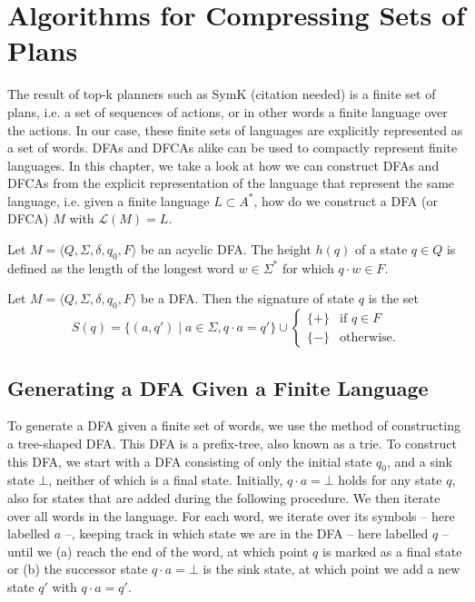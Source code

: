 \chapter{Algorithms for Compressing Sets of Plans}
The result of top-k planners such as SymK (citation needed) is a finite set of plans, i.e. a set of sequences of actions, or in other words a finite language over the actions. In our case, these finite sets of languages are explicitly represented as a set of words. DFAs and DFCAs alike can be used to compactly represent finite languages. In this chapter, we take a look at how we can construct DFAs and DFCAs from the explicit representation of the language that represent the same language, i.e. given a finite language $L \subset A^*$, how do we construct a DFA (or DFCA) $M$ with $\mathcal L(M) = L$.


\begin{definition}
Let $M = \langle Q, \Sigma, \delta, q_0, F \rangle$ be an acyclic DFA. The height $h(q)$ of a state $q \in Q$ is defined as the length of the longest word $w \in \Sigma^*$ for which $q \cdot w \in F$.
\end{definition}

\begin{definition}
Let $M = \langle Q, \Sigma, \delta, q_0, F \rangle$ be a DFA. Then the signature of state $q$ is the set
\[S(q) = \{(a, q') \mid a \in \Sigma, q \cdot a = q'\} \cup \begin{cases}\{+\} &\text{if } q \in F \\\{-\} &\text{otherwise.}\end{cases}\]
\end{definition}

\section{Generating a DFA Given a Finite Language}
To generate a DFA given a finite set of words, we use the method of constructing a tree-shaped DFA. This DFA is a prefix-tree, also known as a trie.
To construct this DFA, we start with a DFA consisting of only the initial state $q_0$, and a sink state $\bot$, neither of which is a final state. Initially, $q \cdot a = \bot$ holds for any state $q$, also for states that are added during the following procedure.
We then iterate over all words in the language.
For each word, we iterate over its symbols -- here labelled $a$ --, keeping track in which state we are in the DFA -- here labelled $q$ -- until we (a) reach the end of the word, at which point $q$ is marked as a final state or (b) the successor state $q \cdot a = \bot$ is the sink state, at which point we add a new state $q'$ with $q \cdot a = q'$.

